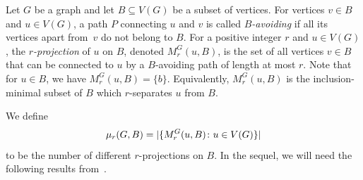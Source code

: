 Let $G$ be a graph and let $B\subseteq V(G)$ be a subset of vertices. For vertices $v\in B$ and $u\in V(G)$, a path $P$ connecting $u$ and $v$ is called {\em{$B$-avoiding}}
if all its vertices apart from~$v$ do not belong to $B$. For a positive integer $r$ and $u\in V(G)$, the {\em{$r$-projection}} of $u$ on $B$, denoted $M^G_r(u,B)$, is the set of all vertices $v\in B$ that
can be connected to $u$ by a $B$-avoiding path of length at most $r$. Note that for $u\in B$, we have $M^G_r(u,B)=\{b\}$.
Equivalently, $M^G_r(u,B)$ is the inclusion-minimal
subset of $B$ which $r$-separates $u$ from $B$.

%
%

We define 
\[\mu_r(G,B)=|\{M_r^G(u,B)\colon u\in V(G)\}|\]
to be the number of different $r$-projections on $B$.
In the sequel, we will need the following results from~\cite{drange2016kernelization,eickmeyer2016neighborhood}.

